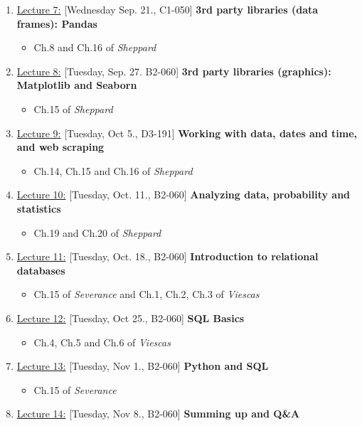 \documentclass[12pt, a4paper]{article}
\begin{document}
\begin{enumerate}
    \item[] \underline{Lecture 7:} [Wednesday Sep. 21., C1-050] {\bf 3rd party libraries (data frames): Pandas}
        \begin{itemize}
            \item Ch.8 and Ch.16 of {\it Sheppard}
        \end{itemize}
    \item[] \underline{Lecture 8:} [Tuesday, Sep. 27. B2-060] {\bf 3rd party libraries (graphics): Matplotlib and Seaborn}
        \begin{itemize}
            \item Ch.15 of {\it Sheppard}
        \end{itemize}
    \item[] \underline{Lecture 9:} [Tuesday, Oct 5., D3-191] {\bf Working with data, dates and time, and web scraping}
        \begin{itemize}
            \item Ch.14, Ch.15 and Ch.16 of {\it Sheppard}
        \end{itemize}
    \item[] \underline{Lecture 10:} [Tuesday, Oct. 11., B2-060] {\bf Analyzing data, probability and statistics}
        \begin{itemize}
            \item Ch.19 and Ch.20 of {\it Sheppard}
        \end{itemize}
    \item[] \underline{Lecture 11:} [Tuesday, Oct. 18., B2-060] {\bf Introduction to relational databases}
        \begin{itemize}
            \item Ch.15 of {\it Severance} and Ch.1, Ch.2, Ch.3 of {\it Viescas}
        \end{itemize}
    \item[] \underline{Lecture 12:} [Tuesday, Oct 25., B2-060] {\bf SQL Basics}
        \begin{itemize}
            \item Ch.4, Ch.5 and Ch.6 of {\it Viescas}
        \end{itemize}
    \item[] \underline{Lecture 13:} [Tuesday, Nov 1., B2-060] {\bf Python and SQL}
        \begin{itemize}
            \item Ch.15 of {\it Severance}
        \end{itemize}
    \item[] \underline{Lecture 14:} [Tuesday, Nov 8., B2-060] {\bf Summing up and Q\&A}
\end{enumerate}
\end{document}
